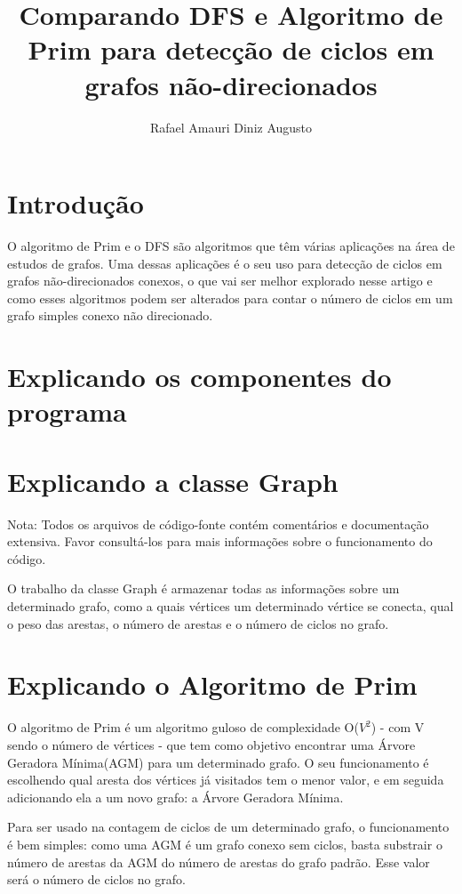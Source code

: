 \documentclass[12pt]{article}
\title{Comparando DFS e Algoritmo de Prim para detecção de ciclos em grafos não-direcionados}
\author{Rafael Amauri Diniz Augusto}
\begin{document}
\maketitle

\tableofcontents
\newpage

\section{Introdução}
O algoritmo de Prim e o DFS são algoritmos que têm várias aplicações na área de estudos de grafos. 
Uma dessas aplicações é o seu uso para detecção de ciclos em grafos não-direcionados conexos, o
que vai ser melhor explorado nesse artigo e como esses algoritmos podem ser alterados para
contar o número de ciclos em um grafo simples conexo não direcionado.\vspace{10pt}

\section{Explicando os componentes do programa}


\section*{Explicando a classe Graph}


Nota: Todos os arquivos de código-fonte contém comentários e documentação extensiva. Favor
consultá-los para mais informações sobre o funcionamento do código.\vspace{10pt}


O trabalho da classe Graph é armazenar todas as informações sobre um determinado grafo, como 
a quais vértices um determinado vértice se conecta, qual o peso das arestas, o número de arestas
e o número de ciclos no grafo.\vspace{10pt}


\section*{Explicando o Algoritmo de Prim}
O algoritmo de Prim é um algoritmo guloso de complexidade O($V^2$) - com V sendo o 
número de vértices - que tem como objetivo encontrar uma Árvore Geradora Mínima(AGM)
para um determinado grafo. O seu funcionamento é escolhendo qual aresta dos vértices
já visitados tem o menor valor, e em seguida adicionando ela a um novo grafo: a 
Árvore Geradora Mínima.

Para ser usado na contagem de ciclos de um determinado grafo, o funcionamento é bem simples: como
uma AGM é um grafo conexo sem ciclos, basta substrair o número de arestas da AGM do número de
arestas do grafo padrão. Esse valor será o número de ciclos no grafo.\vspace{10pt}
\end{document}

